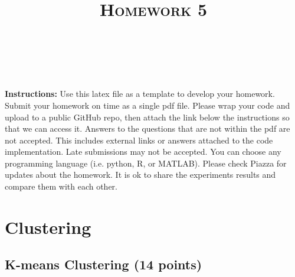 \documentclass[a4paper]{article}
\title{\textsc{Homework 5}} %
\author{
\red{$>>$Huzaifa Mustafa Unjhawala$<<$} \\
\red{$>>$GITHUB LINK - https://github.com/Huzaifg/760.git$<<$}\\
}
\date{}
\theoremstyle{definition}
\begin{document}
\maketitle 


\textbf{Instructions:}
Use this latex file as a template to develop your homework. Submit your homework on time as a single pdf file. Please wrap your code and upload to a public GitHub repo, then attach the link below the instructions so that we can access it. Answers to the questions that are not within the pdf are not accepted. This includes external links or answers attached to the code implementation. Late submissions may not be accepted. You can choose any programming language (i.e. python, R, or MATLAB). Please check Piazza for updates about the homework. It is ok to share the experiments results and compare them with each other.

\vspace{0.1in}


\section{Clustering}

\subsection{K-means Clustering (14 points)}
\end{document}
